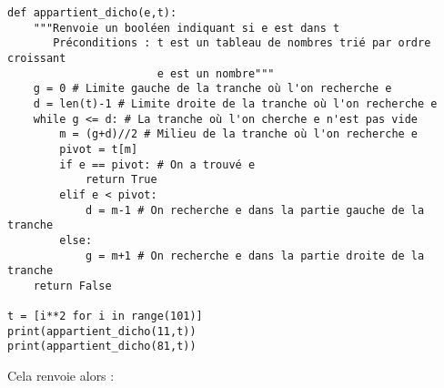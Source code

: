 \begin{lstlisting}
def appartient_dicho(e,t):
    """Renvoie un booléen indiquant si e est dans t
       Préconditions : t est un tableau de nombres trié par ordre croissant
                       e est un nombre"""
    g = 0 # Limite gauche de la tranche où l'on recherche e
    d = len(t)-1 # Limite droite de la tranche où l'on recherche e
    while g <= d: # La tranche où l'on cherche e n'est pas vide
        m = (g+d)//2 # Milieu de la tranche où l'on recherche e
        pivot = t[m] 
        if e == pivot: # On a trouvé e
            return True
        elif e < pivot: 
            d = m-1 # On recherche e dans la partie gauche de la tranche
        else:
            g = m+1 # On recherche e dans la partie droite de la tranche
    return False
    
t = [i**2 for i in range(101)]
print(appartient_dicho(11,t))
print(appartient_dicho(81,t))
\end{lstlisting}
Cela renvoie alors :
\begin{quote}
\end{quote}


